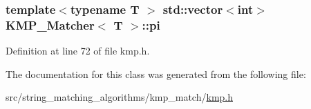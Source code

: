 \subsubsection[{pi}]{\setlength{\rightskip}{0pt plus 5cm}template$<$typename T $>$ std\+::vector$<$int$>$ {\bf K\+M\+P\+\_\+\+Matcher}$<$ T $>$\+::pi\hspace{0.3cm}{\ttfamily [private]}}\label{class_k_m_p___matcher_aa9f9d7ea70dd1c590bee7de00b25ffeb}


Definition at line 72 of file kmp.\+h.



The documentation for this class was generated from the following file\+:\begin{DoxyCompactItemize}
\item 
src/string\+\_\+matching\+\_\+algorithms/kmp\+\_\+match/\hyperlink{kmp_8h}{kmp.\+h}\end{DoxyCompactItemize}
